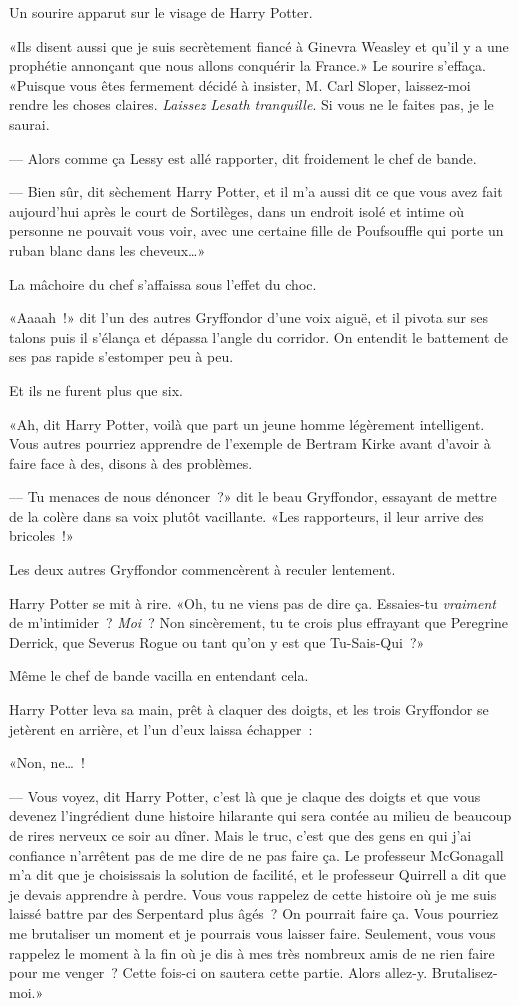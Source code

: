 Un sourire apparut sur le visage de Harry Potter.

«Ils disent aussi que je suis secrètement fiancé à Ginevra Weasley et qu'il y a une prophétie annonçant que nous allons conquérir la France.» Le sourire s'effaça. «Puisque vous êtes fermement décidé à insister, M. Carl Sloper, laissez-moi rendre les choses claires. \emph{Laissez Lesath tranquille}. Si vous ne le faites pas, je le saurai.

--- Alors comme ça Lessy est allé rapporter, dit froidement le chef de bande.

--- Bien sûr, dit sèchement Harry Potter, et il m'a aussi dit ce que vous avez fait aujourd'hui après le court de Sortilèges, dans un endroit isolé et intime où personne ne pouvait vous voir, avec une certaine fille de Poufsouffle qui porte un ruban blanc dans les cheveux…»

La mâchoire du chef s'affaissa sous l'effet du choc.

«Aaaah~!» dit l'un des autres Gryffondor d'une voix aiguë, et il pivota sur ses talons puis il s'élança et dépassa l'angle du corridor. On entendit le battement de ses pas rapide s'estomper peu à peu.

Et ils ne furent plus que six.

«Ah, dit Harry Potter, voilà que part un jeune homme légèrement intelligent. Vous autres pourriez apprendre de l'exemple de Bertram Kirke avant d'avoir à faire face à des, disons à des problèmes.

--- Tu menaces de nous dénoncer~?» dit le beau Gryffondor, essayant de mettre de la colère dans sa voix plutôt vacillante. «Les rapporteurs, il leur arrive des bricoles~!»

Les deux autres Gryffondor commencèrent à reculer lentement.

Harry Potter se mit à rire. «Oh, tu ne viens pas de dire ça. Essaies-tu \emph{vraiment} de m'intimider~? \emph{Moi}~? Non sincèrement, tu te crois plus effrayant que Peregrine Derrick, que Severus Rogue ou tant qu'on y est que Tu-Sais-Qui~?»

Même le chef de bande vacilla en entendant cela.

Harry Potter leva sa main, prêt à claquer des doigts, et les trois Gryffondor se jetèrent en arrière, et l'un d'eux laissa échapper~:

«Non, ne…~!

--- Vous voyez, dit Harry Potter, c'est là que je claque des doigts et que vous devenez l'ingrédient dune histoire hilarante qui sera contée au milieu de beaucoup de rires nerveux ce soir au dîner. Mais le truc, c'est que des gens en qui j'ai confiance n'arrêtent pas de me dire de ne pas faire ça. Le professeur McGonagall m'a dit que je choisissais la solution de facilité, et le professeur Quirrell a dit que je devais apprendre à perdre. Vous vous rappelez de cette histoire où je me suis laissé battre par des Serpentard plus âgés~? On pourrait faire ça. Vous pourriez me brutaliser un moment et je pourrais vous laisser faire. Seulement, vous vous rappelez le moment à la fin où je dis à mes très nombreux amis de ne rien faire pour me venger~? Cette fois-ci on sautera cette partie. Alors allez-y. Brutalisez-moi.»

